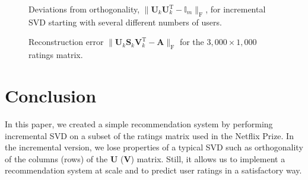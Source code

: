 \documentclass{article} %
\newcommand{\A}{\mathbf{A}}
\newcommand{\T}{\textrm{T}}
\begin{document}
\begin{figure}[H]
\begin{center}
\end{center}
\caption{Deviations from orthogonality, 
$\|\mathbf{U}_k\mathbf{U}_k^{\T} - \mathbb{I}_m\|_{\textrm{F}}$, for
incremental SVD starting with several different numbers of users.}
\label{fig:ortho_small}
\end{figure}

\begin{figure}[H]
\begin{center}
\end{center}
\caption{Reconstruction error
$\|\mathbf{U}_k\mathbf{S}_k\mathbf{V}_k^{\T} - \A\|_{\textrm{F}}$ for
the $3,000 \times 1,000$ ratings matrix.}
\label{fig:recon_small}
\end{figure}

\section{Conclusion}
In this paper, we created a simple recommendation system by performing incremental SVD on a subset of the ratings matrix used in the Netflix Prize.
In the incremental version, we lose properties of a typical SVD such as orthogonality of the columns (rows) of the $\mathbf{U}$ ($\mathbf{V}$) matrix.
Still, it allows us to implement a recommendation system at scale and to predict user ratings in a satisfactory way.




\end{document}
